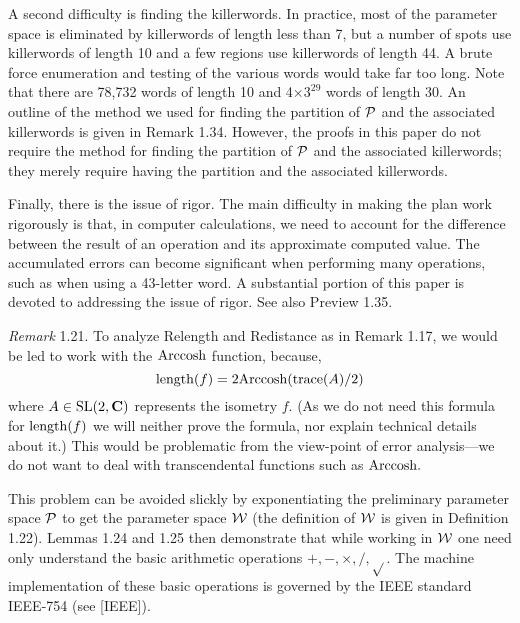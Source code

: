 A second difficulty is finding the killerwords.  In practice, most of the
parameter space is eliminated by killerwords of length less than 7, but a number of spots use killerwords of length 10
and a few regions use killerwords of
length 44.  A brute force enumeration and testing of the various words
would take far too long.  Note that there are
78,732 words of length 10 and 4$\times 3^{29}$ words of length 30.  An outline of the method we used  for finding the partition of ${\cal P}$ and the associated killerwords is given in Remark 1.34.  However, the proofs in this paper do not require the method for finding the partition of ${\cal P}$ and the associated
killerwords; they merely require having the partition and the associated killerwords.

Finally, there is the issue of rigor.
The main difficulty in making the plan work rigorously is that, in computer calculations, we need to account for the difference
between the result of an operation and its approximate computed value.
The accumulated errors can become significant when performing
many operations, such as when using a 43-letter 
word.  A substantial portion of this paper is devoted to addressing
the  issue of rigor.  See also Preview 1.35.

{\it Remark} 1.21.
To analyze Relength and Redistance as in Remark 1.17, we would be led to work with the ${\rm Arccosh}$ function, because, 
$${\rm length}(f) = 2{\rm Arccosh}({\rm trace}(A)/2)$$
where $A\in {\rm SL}(2,{\bf C})$ represents the isometry $f.$
(As we do not need this formula for ${\rm length}(f)$ we will neither prove the formula, nor explain technical details about it.)  This would be problematic from the view-point of error analysis---we do not want to deal with transcendental functions such as ${\rm Arccosh}.$  

This problem can be  avoided slickly by exponentiating the preliminary parameter space ${\cal P}$ to get the parameter space ${\cal W}$ (the
definition of ${\cal W}$ is given in Definition 1.22).   Lemmas 1.24 and 1.25 then demonstrate
that while working in ${\cal W}$ one need only
understand the basic arithmetic operations $+, -, \times, /, \sqrt{}$.
The machine implementation of these basic operations is governed by the IEEE standard IEEE-754 (see [IEEE]).

